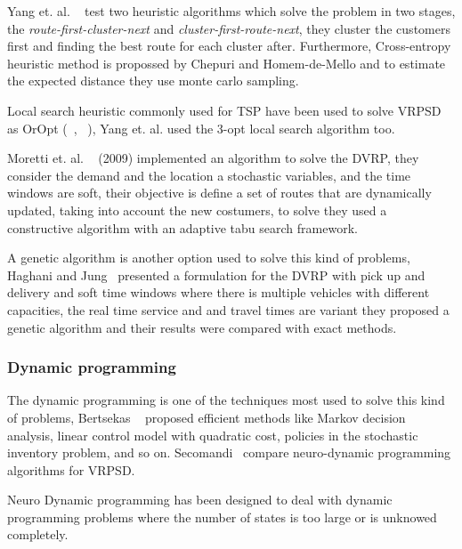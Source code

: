 Yang et. al. ~\cite{yang_stochastic_2000} test two heuristic algorithms which solve the problem in two stages, the \textit{route-first-cluster-next} and \textit{cluster-first-route-next}, they cluster the customers  first and finding the best route for each cluster after. Furthermore, Cross-entropy heuristic method is propossed by Chepuri and Homem-de-Mello \cite{Chepuri} and to estimate the expected distance they use monte carlo sampling.

Local search heuristic commonly used for TSP have been used to solve VRPSD as OrOpt (~\cite{yang_stochastic_2000}, ~\cite{bianchi_hybrid_2006}), Yang et. al. used the 3-opt local search algorithm too.

Moretti et. al. ~\cite{Moretti} (2009) implemented an algorithm to solve the DVRP, they consider the demand and the location a stochastic variables, and the time windows are soft, their objective is define a set of routes that are dynamically updated, taking into account the new costumers, to solve they used a constructive algorithm with an adaptive tabu search framework.

A genetic algorithm is another option used to solve this kind of problems, Haghani and Jung~\cite{haghani_dynamic_2005} presented a formulation for the DVRP with pick up and delivery and soft time windows  where there is multiple vehicles with different capacities, the real time service and and travel times are variant they proposed a genetic algorithm and their results were compared with exact methods.

\subsubsection{Dynamic programming}


The dynamic programming is one of the techniques most used to solve this kind of problems, Bertsekas ~\cite{Bertsekas} proposed efficient methods like Markov decision analysis, linear control model with quadratic cost, policies in the stochastic inventory problem, and so on. Secomandi~\cite{secomandi_comparing_2000} compare neuro-dynamic programming algorithms for VRPSD.

Neuro Dynamic programming has been designed to deal with dynamic programming problems where the number of states is too large or is unknowed completely.

